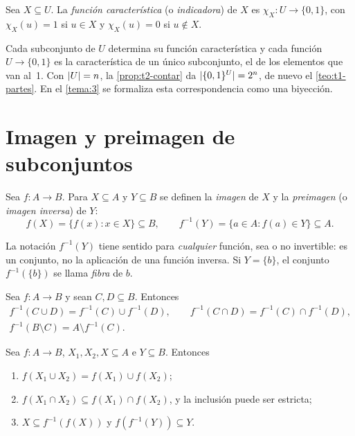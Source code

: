 \begin{definicion}
Sea $X\subseteq U$. La \emph{función característica} (o \emph{indicadora}) de $X$ es $\chi_X\colon U\to\{0,1\}$, con $\chi_X(u)=1$ si $u\in X$ y $\chi_X(u)=0$ si $u\notin X$.
\end{definicion}

Cada subconjunto de $U$ determina su función característica y cada función $U\to\{0,1\}$ es la característica de un único subconjunto, el de los elementos que van al~1. Con $\lvert U\rvert=n$, la \cref{prop:t2-contar} da $\lvert\{0,1\}^{U}\rvert=2^{n}$, de nuevo el \cref{teo:t1-partes}. En el \cref{tema:3} se formaliza esta correspondencia como una biyección.

\section{Imagen y preimagen de subconjuntos}

\begin{definicion}\label{def:t2-imagen}
Sea $f\colon A\to B$. Para $X\subseteq A$ y $Y\subseteq B$ se definen la \emph{imagen} de $X$ y la \emph{preimagen} (o \emph{imagen inversa}) de $Y$:
\[
f(X)=\{f(x): x\in X\}\subseteq B,\qquad f^{-1}(Y)=\{a\in A: f(a)\in Y\}\subseteq A.
\]
\end{definicion}

La notación $f^{-1}(Y)$ tiene sentido para \emph{cualquier} función, sea o no invertible: es un conjunto, no la aplicación de una función inversa. Si $Y=\{b\}$, el conjunto $f^{-1}(\{b\})$ se llama \emph{fibra} de $b$.

\addtocounter{definicion}{1}%

\begin{teorema}\label{teo:t2-preimagen}
Sea $f\colon A\to B$ y sean $C,D\subseteq B$. Entonces
\begin{gather*}
f^{-1}(C\cup D)=f^{-1}(C)\cup f^{-1}(D),\qquad f^{-1}(C\cap D)=f^{-1}(C)\cap f^{-1}(D),\\
f^{-1}(B\setminus C)=A\setminus f^{-1}(C).
\end{gather*}
\end{teorema}

\begin{teorema}\label{teo:t2-imagen}
Sea $f\colon A\to B$, $X_1,X_2,X\subseteq A$ e $Y\subseteq B$. Entonces
\begin{enumerate}
  \item $f(X_1\cup X_2)=f(X_1)\cup f(X_2)$;
  \item $f(X_1\cap X_2)\subseteq f(X_1)\cap f(X_2)$, y la inclusión puede ser estricta;
  \item $X\subseteq f^{-1}(f(X))$ y $f(f^{-1}(Y))\subseteq Y$.
\end{enumerate}
\end{teorema}

